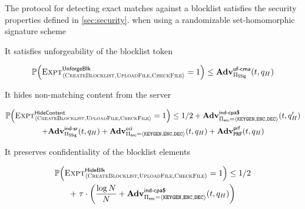 \begin{theorem}
	
	The protocol \protocolEMP for detecting exact matches against a blocklist satisfies the security properties defined in \ref{sec:security}.
when using a randomizable set-homomorphic signature scheme \ourSigSchemeDefn 

\enumListStart
	
	\item It satisfies unforgeability of the blocklist token 
	\begin{small}
	\begin{gather*}
    \mathbb{P}\mathopen{}\left({\textsc{Expt}^{\mathsf{UnforgeBlk}}_{\langle \textsc{CreateBlocklist}, \textsc{UploadFile}, \textsc{CheckFile} \rangle} = 1}\right)\mathclose{} \le \mathbf{Adv}^{\scriptsize\textsf{uf-cma}}_{\Pi_{\mathsf{SSig}} }(t, q_H)
\end{gather*}
	\end{small}
	
	\item It hides non-matching content from the server 
	
	\begin{small}
					\begin{gather*}
			\prob{\hidingContentExp = 1} \le 1/2 + \Advantage{\indcpaRandLabel}{\encryptionSchemeDefn}(\timeBound, 
		\oracleQueries') \\  + \indsrAdv +  \Advantage{\cciLabel}{\encryptionSchemeDefn}(\timeBound, \oracleQueries)  +  \Advantage{\prfLabel}{\prf}(\timeBound, \oracleQueries)
		\end{gather*}
		\end{small}
	
	\item It preserves confidentiality of the blocklist elements
	
	\begin{small}
				\begin{gather*}
				\prob{\hidingBlocklistExp = 1} \le 1/2  \\ + ~\numBlocklistParts \cdot \left(\frac{\log \rsaMod}{\rsaMod} + \Advantage{\indcpaRandLabel}{\encryptionSchemeDefn}(\timeBound, \oracleQueries)\right)
			\end{gather*}
		\end{small}
	
	\enumListEnd  




\end{theorem}


